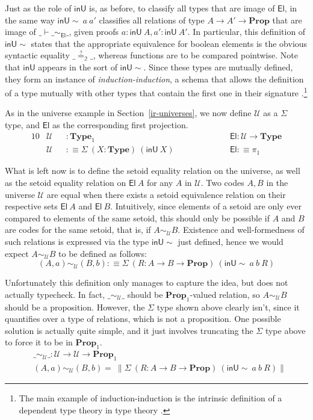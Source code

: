 \documentclass[autoref]{llncs}
\newcommand{\setoidU}{\mathcal{U}}
\newcommand{\inU}{\mathsf{inU}}
\newcommand{\inUU}{\mathsf{inU{\sim}}}
\newcommand{\mType}{\mathbf{Type}}
\newcommand{\mProp}{\mathbf{Prop}}
\newcommand{\El}{\textsf{El}}
\providecommand\mathbbm{\mathbb}
\begin{document}
Just as the role of $\inU$ is, as before, to classify all types that are image
of $\El$, in the same way $\inUU\ a\ a'$ classifies all relations of type $A \to
A' \to \mProp$ that are image of $\_\vdash\_\sim_{\El}\_$, given proofs $a :
\inU\ A, a' : \inU\ A'$.
%
In particular, this definition of $\inUU$ states that the appropriate
equivalence for boolean elements is the obvious syntactic equality
$\_\stackrel{?}{=}_{\mathbbm{2}}\_$, whereas functions are to be compared
pointwise.
%
Note that $\inU$ appears in the sort of $\inUU$. Since these types are
mutually defined, they form an instance of \emph{induction-induction}, a schema
that allows the definition of a type mutually with other types that contain the
first one in their signature \cite{ii}.\footnote{The main example of
  induction-induction is the intrinsic definition of a dependent type theory in
  type theory \cite{tt-in-tt}.}

As in the universe example in Section~\ref{ir-universes}, we now define
$\setoidU$ as a $\Sigma$ type, and $\El$ as the corresponding first projection.
\vspace{-0.2em}
\begin{alignat*}{10}
  & \setoidU && : \mType_1 && \El : \setoidU \to \mType \\
  & \setoidU && :\equiv \Sigma\ (X : \mType)\ (\inU\ X) \hspace{5em} && \El :\equiv \pi_1
\end{alignat*}

What is left now is to define the setoid equality relation on the universe, as
well as the setoid equality relation on $\El\ A$ for any $A$ in $\setoidU$.
%
Two codes $A, B$ in the universe $\setoidU$ are equal when there exists a setoid
equivalence relation on their respective sets $\El\ A$ and $\El\ B$. Intuitively,
since elements of a setoid are only ever compared to elements of the same
setoid, this should only be possible if $A$ and $B$ are codes for the same setoid,
that is, if $A \sim_{\setoidU} B$. Existence and well-formedness of such
relations is expressed via the type $\inUU$ just defined, hence we would
expect $A \sim_{\setoidU} B$ to be defined as follows:
\[
(A, a) \sim_{\setoidU} (B, b) :\equiv \Sigma\ (R: A \to B \to \mProp)\ (\inUU\ a\ b\ R)
\]

Unfortunately this definition only manages to capture the idea, but does not
actually typecheck. In fact, $\_\sim_{\setoidU}\_$ should be $\mProp_1$-valued
relation, so $A \sim_{\setoidU} B$ should be a proposition. However, the
$\Sigma$ type shown above clearly isn't, since it quantifies over a type of
relations, which is not a proposition.
%
One possible solution is actually quite simple, and it just involves truncating
the $\Sigma$ type above to force it to be in $\mProp_1$.
\vspace{-0.2em}
\begin{align*}
  & \_\sim_{\setoidU}\_ : \setoidU \to \setoidU \to \mProp_1 \\
  & (A , a) \sim_{\setoidU} (B , b) =
   \ \parallel \Sigma\ (R : A \to B \to \mProp)\ (\inUU\ a\ b\ R) \parallel
\end{align*}
\end{document}
